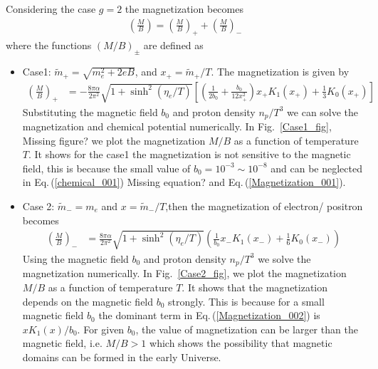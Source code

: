 \documentclass[universe,article,submit,moreauthors,pdftex,a4paper]{Definitions/mdpi}
\newcommand{\req}[1]{Eq.\,(\ref{#1})}
\newcommand*{\rf}[1]{Fig.~{\ref{#1}}}
\newcommand*{\xred}{\color{red}}
\begin{document}
Considering the case $g=2$ the magnetization becomes
\begin{align}
\left(\frac{M}{B}\right)=\left(\frac{M}{B}\right)_++\left(\frac{M}{B}\right)_-
\end{align}
where the functions $(M/B)_\pm$ are defined as 
\begin{itemize}
  \item Case1: $\tilde m_+=\sqrt{m^2_e+2eB}$, and $x_+=\tilde m_+/T$. The magnetization is given by
\begin{align}\label{Magnetization_001}
 \left(\frac{M}{B}\right)_+&=-\frac{8\pi\alpha}{2\pi^2}\sqrt{1+\sinh^2(\eta_e/T)}\left[\left(\frac{1}{2b_0}+\frac{b_0}{12x_+^2}\right)x_+K_1(x_+)+\frac{1}{3}K_0(x_+)\right]
\end{align}
Substituting the magnetic field $b_0$ and proton density $n_p/T^3$  we can solve the magnetization and chemical potential numerically. In \rf{Case1_fig}, {\xred Missing figure?} we plot the  magnetization $M/B$ as a function of temperature $T$. It shows for the case1 the magnetization is not sensitive to the magnetic field, this is because the small value of $b_0=10^{-3}\sim10^{-8}$ and can be neglected in \req{chemical_001} {\xred Missing equation?} and \req{Magnetization_001}.
  \item Case 2: $\tilde m_-=m_e$ and $x=\tilde m_-/T$,then the magnetization of electron/ positron becomes
\begin{align}\label{Magnetization_002}
\left(\frac{M}{B}\right)_-&=\frac{8\pi\alpha}{2\pi^2}\sqrt{1+\sinh^2(\eta_e/T)}\left(\frac{1}{b_0}x_-K_1(x_-)+\frac{1}{6}K_0(x_-)\right)
\end{align}
Using the magnetic field $b_0$ and proton density $n_p/T^3$ we solve the magnetization  numerically. In \rf{Case2_fig}, we plot the  magnetization $M/B$ as a function of temperature $T$. It shows that the magnetization depends on the magnetic field $b_0$ strongly. This is because for a small magnetic field $b_0$ the dominant term in \req{Magnetization_002} is $xK_1(x)/b_0$. For given $b_0$, the value of magnetization can be larger than the magnetic field, i.e. $M/B>1$  which shows the possibility that magnetic domains can be formed in the early Universe.
\end{itemize}

\end{document}
